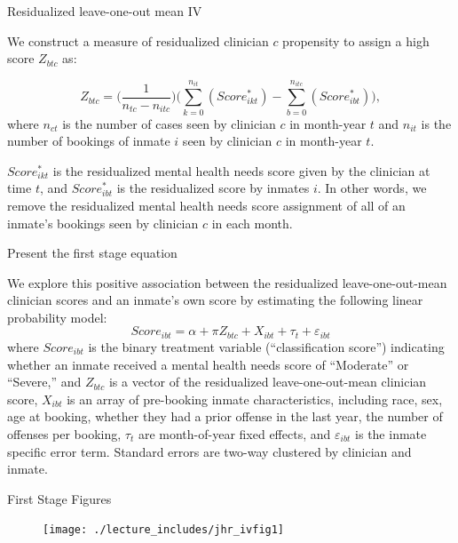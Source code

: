\documentclass{beamer}
\begin{document}
\begin{frame}{Residualized leave-one-out mean IV}

We construct a measure of residualized clinician $c$ propensity to assign a high score $Z_{btc}$ as:

\begin{equation}
    \label{eq:instrument}
    Z_{btc} = \bigg(\frac{1}{n_{tc}-n_{itc}}\bigg) \bigg( \sum_{k=0}^{n_{it}} (Score^{*}_{ikt}) - \sum_{b=0}^{n_{itc}} (Score^{*}_{ibt}) \bigg),
\end{equation} where $n_{ct}$ is the number of cases seen by clinician $c$ in month-year $t$ and $n_{it}$ is the number of bookings of inmate $i$ seen by clinician $c$ in month-year $t$.

\bigskip

$Score^{*}_{ikt}$ is the residualized mental health needs score given by the clinician at time $t$, and $Score^{*}_{ibt}$ is the residualized score by inmates $i$.   In other words, we remove the residualized mental health needs score assignment of all of an inmate’s bookings seen by clinician $c$ in each month.

\end{frame}

\begin{frame}{Present the first stage equation}

We explore this positive association between the residualized leave-one-out-mean clinician scores and an inmate's own score by estimating the following linear probability model:
\begin{equation}
Score_{ibt} = \alpha + \pi Z_{btc} + X_{ibt} + \tau_t + \varepsilon_{ibt}\label{eq:firststage}
\end{equation}where $Score_{ibt}$ is the binary treatment variable (``classification score'') indicating whether an inmate received a mental health needs score of ``Moderate'' or ``Severe,'' and $Z_{btc}$ is a vector of the residualized leave-one-out-mean clinician score, $X_{ibt}$ is an array of pre-booking inmate characteristics, including race, sex, age at booking, whether they had a prior offense in the last year, the number of offenses per booking, $\tau_t$ are month-of-year fixed effects, and $\varepsilon_{ibt}$ is the inmate specific error term. Standard errors are two-way clustered by clinician and inmate.   

\end{frame}

\begin{frame}{First Stage Figures}
	\begin{figure}
             \centering
             \texttt{[image: ./lecture\_includes/jhr\_ivfig1]}
	\end{figure}
\end{frame}
\end{document}
